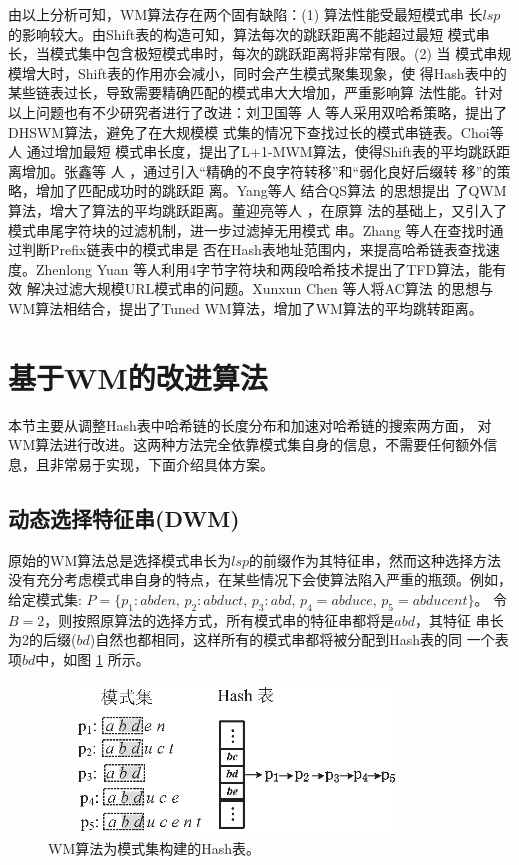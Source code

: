 由以上分析可知，WM算法存在两个固有缺陷：(1) 算法性能受最短模式串
长$lsp$的影响较大。由Shift表的构造可知，算法每次的跳跃距离不能超过最短
模式串长，当模式集中包含极短模式串时，每次的跳跃距离将非常有限。(2) 当
模式串规模增大时，Shift表的作用亦会减小，同时会产生模式聚集现象，使
得Hash表中的某些链表过长，导致需要精确匹配的模式串大大增加，严重影响算
法性能。针对以上问题也有不少研究者进行了改进：刘卫国等
人 \cite{Liu2011} 等人采用双哈希策略，提出了DHSWM算法，避免了在大规模模
式集的情况下查找过长的模式串链表。Choi等人\cite{Choi2011} 通过增加最短
模式串长度，提出了L+1-MWM算法，使得Shift表的平均跳跃距离增加。张鑫等
人 \cite{Zhang2003}，通过引入“精确的不良字符转移”和“弱化良好后缀转
移”的策略，增加了匹配成功时的跳跃距
离。Yang等人\cite{Hong2007} 结合QS算法 \cite{Sunday1990} 的思想提出
了QWM算法，增大了算法的平均跳跃距离。董迎亮等人 \cite{Dong2011}，在原算
法的基础上，又引入了模式串尾字符块的过滤机制，进一步过滤掉无用模式
串。Zhang \cite{Zhang2009b} 等人在查找时通过判断Prefix链表中的模式串是
否在Hash表地址范围内，来提高哈希链表查找速度。Zhenlong Yuan
\cite{Yuan2013} 等人利用4字节字符块和两段哈希技术提出了TFD算法，能有效
解决过滤大规模URL模式串的问题。Xunxun Chen \cite{Chen2005} 等人将AC算法
的思想与WM算法相结合，提出了Tuned WM算法，增加了WM算法的平均跳转距离。


\section{基于WM的改进算法}
\label{sec:5_DWM+}

本节主要从调整Hash表中哈希链的长度分布和加速对哈希链的搜索两方面，
对WM算法进行改进。这两种方法完全依靠模式集自身的信息，不需要任何额外信
息，且非常易于实现，下面介绍具体方案。

\subsection{动态选择特征串(DWM)}
\label{sec:5_DWM
}

原始的WM算法总是选择模式串长为$lsp$的前缀作为其特征串，然而这种选择方法
没有充分考虑模式串自身的特点，在某些情况下会使算法陷入严重的瓶颈。例如，
给定模式集:
$P=\{p_1:abden,\, p_2:abduct,\, p_3:abd,\, p_4=abduce,\,
p_5=abducent\}$。
令$B=2$，则按照原算法的选择方式，所有模式串的特征串都将是$abd$，其特征
串长为2的后缀($bd$)自然也都相同，这样所有的模式串都将被分配到Hash表的同
一个表项$bd$中，如图 \ref{fig:WM_hash_table1} 所示。


\begin{figure}[H]
  \centering
  \includegraphics[height=4cm ,width=10cm]{figures/5_WM/hash_table1.eps}
  \caption{WM算法为模式集构建的Hash表。}
  \label{fig:WM_hash_table1}
\end{figure}

